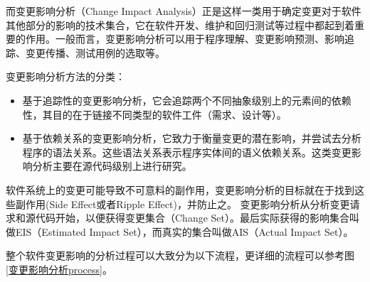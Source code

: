 而变更影响分析（Change Impact Analysis）正是这样一类用于确定变更对于软件其他部分的影响的技术集合\cite{li2013survey}，它在软件开发、维护和回归测试等过程中都起到着重要的作用\cite{acharya2011practical}。一般而言，变更影响分析可以用于程序理解、变更影响预测、影响追踪、变更传播、测试用例的选取等。

变更影响分析方法的分类：
\begin{itemize}
	\item 基于追踪性的变更影响分析\cite{de2008traceability}，它会追踪两个不同抽象级别上的元素间的依赖性，其目的在于链接不同类型的软件工件（需求、设计等）。

	\item 基于依赖关系的变更影响分析\cite{law2003incremental}，它致力于衡量变更的潜在影响，并尝试去分析程序的语法关系。这些语法关系表示程序实体间的语义依赖关系。这类变更影响分析主要在源代码级别上进行研究。
\end{itemize}

软件系统上的变更可能导致不可意料的副作用，变更影响分析的目标就在于找到这些副作用(Side Effect或者Ripple Effect)\cite{bohner1996software}，并防止之。
变更影响分析从分析变更请求和源代码开始，以便获得变更集合（Change Set）。最后实际获得的影响集合叫做EIS（Estimated Impact Set），而真实的集合叫做AIS（Actual Impact Set）。

整个软件变更影响的分析过程可以大致分为以下流程\cite{de2008traceability,bohner2002software}，更详细的流程可以参考图\ref {变更影响分析process}。

